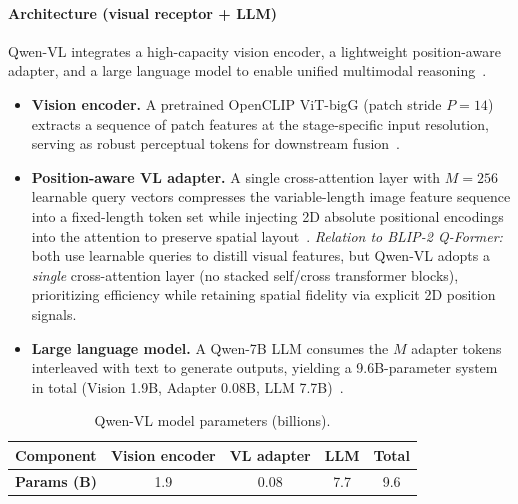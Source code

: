 \begin{enrichment}
\begin{enrichment}
        \paragraph{Architecture (visual receptor + LLM)}
        Qwen\mbox{-}VL integrates a high\mbox{-}capacity vision encoder, a lightweight position\mbox{-}aware adapter, and a large language model to enable unified multimodal reasoning~\cite{bai2023_qwenvl}.
        \begin{itemize}
            \item \textbf{Vision encoder.} A pretrained OpenCLIP ViT\mbox{-}bigG (patch stride $P{=}14$) extracts a sequence of patch features at the stage\mbox{-}specific input resolution, serving as robust perceptual tokens for downstream fusion~\cite{bai2023_qwenvl}.
            \item \textbf{Position\mbox{-}aware VL adapter.} A single cross\mbox{-}attention layer with $M{=}256$ learnable query vectors compresses the variable\mbox{-}length image feature sequence into a fixed\mbox{-}length token set while injecting 2D absolute positional encodings into the attention to preserve spatial layout~\cite{bai2023_qwenvl}. \emph{Relation to BLIP\mbox{-}2 Q\mbox{-}Former:} both use learnable queries to distill visual features, but Qwen\mbox{-}VL adopts a \emph{single} cross\mbox{-}attention layer (no stacked self/cross transformer blocks), prioritizing efficiency while retaining spatial fidelity via explicit 2D position signals.
            \item \textbf{Large language model.} A Qwen\mbox{-}7B LLM consumes the $M$ adapter tokens interleaved with text to generate outputs, yielding a 9.6B\mbox{-}parameter system in total (Vision 1.9B, Adapter 0.08B, LLM 7.7B)~\cite[Table~1]{bai2023_qwenvl}.
        \end{itemize}
        
        \begin{table}[H]
            \centering
            \small
            \setlength{\tabcolsep}{6pt}
            \renewcommand{\arraystretch}{1.1}
            \caption{Qwen\mbox{-}VL model parameters (billions).}
            \label{tab:chapter24_qwenvl_params}
            \begin{tabular}{lcccc}
                \toprule
                \textbf{Component} & \textbf{Vision encoder} & \textbf{VL adapter} & \textbf{LLM} & \textbf{Total} \\
                \midrule
                \textbf{Params (B)} & 1.9 & 0.08 & 7.7 & 9.6 \\
                \bottomrule
            \end{tabular}
        \end{table}
        

\end{enrichment}
\end{enrichment}
